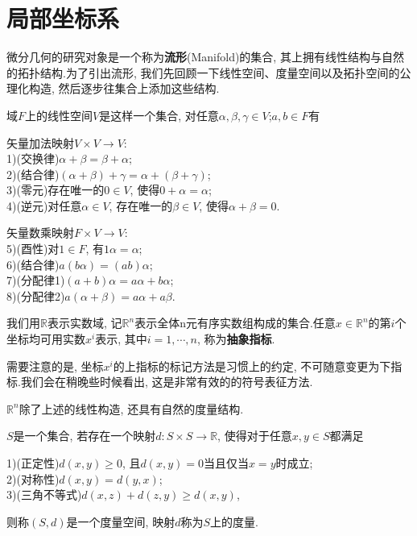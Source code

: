 \section{局部坐标系}\label{sec:Coordinates}
微分几何的研究对象是一个称为\textbf{流形}(Manifold)的集合, 其上拥有线性结构与自然的拓扑结构.为了引出流形, 我们先回顾一下线性空间、度量空间以及拓扑空间的公理化构造, 然后逐步往集合上添加这些结构.
\begin{definition}
  域$F$上的线性空间$V$是这样一个集合, 对任意$\alpha,\beta,\gamma\in V$;$a,b\in F$有

  矢量加法映射$V\times V\rightarrow V$: \\
  1)(交换律)$\alpha+\beta=\beta+\alpha$;\\
  2)(结合律)$(\alpha+\beta)+\gamma=\alpha+(\beta+\gamma)$;\\
  3)(零元)存在唯一的$0\in V$, 使得$0+\alpha=\alpha$;\\
  4)(逆元)对任意$\alpha\in V$, 存在唯一的$\beta\in V$, 使得$\alpha+\beta=0$.

  矢量数乘映射$F\times V\rightarrow V$: \\
  5)(酉性)对$1\in F$, 有$1\alpha=\alpha$;\\
  6)(结合律)$a(b\alpha)=(ab)\alpha$;\\
  7)(分配律1)$(a+b)\alpha=a\alpha+b\alpha$;\\
  8)(分配律2)$a(\alpha+\beta)=a\alpha+a\beta$.
\end{definition}
我们用$\mathbb{R}$表示实数域, 记$\mathbb{R}^n$表示全体n元有序实数组构成的集合.任意$x\in\mathbb{R}^n$的第$i$个坐标均可用实数$x^i$表示, 其中$i=1,\cdots,n$, 称为\textbf{抽象指标}.
\begin{remark}
  需要注意的是, 坐标$x^i$的上指标的标记方法是习惯上的约定, 不可随意变更为下指标.我们会在稍晚些时候看出, 这是非常有效的的符号表征方法.
\end{remark}
$\mathbb{R}^n$除了上述的线性构造, 还具有自然的度量结构.
\begin{definition}
  $S$是一个集合, 若存在一个映射$d:S\times S\rightarrow \mathbb{R}$, 使得对于任意$x,y\in S$都满足

  1)(正定性)$d(x,y)\geqslant 0$, 且$d(x,y)=0$当且仅当$x=y$时成立;\\
  2)(对称性)$d(x,y)=d(y,x)$;\\
  3)(三角不等式)$d(x,z)+d(z,y)\geqslant d(x,y)$,

  则称$(S,d)$是一个度量空间, 映射$d$称为$S$上的度量.
\end{definition}
